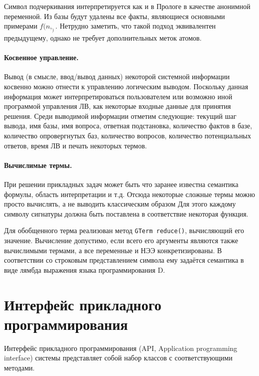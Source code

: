 Символ подчеркивания интерпретируется как и в Прологе в качестве анонимной переменной. Из базы будут удалены все факты, являющиеся основными примерами  $f(n,_)$. Нетрудно заметить, что такой подход эквивалентен предыдущему, однако не требует дополнительных меток атомов.

\paragraph{Косвенное управление.} Вывод (в смысле, ввод/вывод данных) некоторой системной информации косвенно можно отнести к управлению логическим выводом. Поскольку данная информация может интерпретироваться пользователем или возможно иной программой управления ЛВ, как некоторые входные данные для принятия решения. Среди выводимой информации отметим следующие: текущий шаг вывода, имя базы, имя вопроса, ответная подстановка, количество фактов в базе, количество опровергнутых баз, количество вопросов, количество потенциальных ответов, время ЛВ и печать некоторых термов.

\paragraph{Вычислимые термы.} При решении прикладных задач может быть что заранее известна семантика формулы, область интерпретации и т.д. Отсюда некоторые сложные термы можно просто вычислять, а не выводить классическим образом
Для этого каждому символу сигнатуры должна быть поставлена в соответствие некоторая функция.

Для обобщенного терма реализован метод \texttt{GTerm reduce()}, вычисляющий его значение. Вычисление допустимо, если всего его аргументы являются также вычислимыми термами, а все переменные и НЭЭ конкретизированы. В соответствии со строковым представлением символа ему задаётся семантика в виде лямбда выражения языка программирования D.




\section{Интерфейс прикладного программирования}
Интерфейс прикладного программирования (API, Application programming interface) системы представляет собой набор классов с соответствующими методами.

